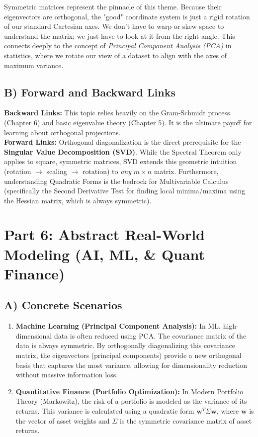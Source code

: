 \documentclass[11pt, letterpaper]{article}
\theoremstyle{definition}
\theoremstyle{remark}
\begin{document}
Symmetric matrices represent the pinnacle of this theme. Because their eigenvectors are orthogonal, the "good" coordinate system is just a rigid rotation of our standard Cartesian axes. We don't have to warp or skew space to understand the matrix; we just have to look at it from the right angle. This connects deeply to the concept of \textit{Principal Component Analysis (PCA)} in statistics, where we rotate our view of a dataset to align with the axes of maximum variance.

\subsection{B) Forward and Backward Links}
\textbf{Backward Links:} This topic relies heavily on the Gram-Schmidt process (Chapter 6) and basic eigenvalue theory (Chapter 5). It is the ultimate payoff for learning about orthogonal projections. \\
\textbf{Forward Links:} Orthogonal diagonalization is the direct prerequisite for the \textbf{Singular Value Decomposition (SVD)}. While the Spectral Theorem only applies to square, symmetric matrices, SVD extends this geometric intuition (rotation $\to$ scaling $\to$ rotation) to \textit{any} $m \times n$ matrix. Furthermore, understanding Quadratic Forms is the bedrock for Multivariable Calculus (specifically the Second Derivative Test for finding local minima/maxima using the Hessian matrix, which is always symmetric).

\section{Part 6: Abstract Real-World Modeling (AI, ML, \& Quant Finance)}

\subsection{A) Concrete Scenarios}
\begin{enumerate}
    \item \textbf{Machine Learning (Principal Component Analysis):} In ML, high-dimensional data is often reduced using PCA. The covariance matrix of the data is always symmetric. By orthogonally diagonalizing this covariance matrix, the eigenvectors (principal components) provide a new orthogonal basis that captures the most variance, allowing for dimensionality reduction without massive information loss.
    \item \textbf{Quantitative Finance (Portfolio Optimization):} In Modern Portfolio Theory (Markowitz), the risk of a portfolio is modeled as the variance of its returns. This variance is calculated using a quadratic form $\mathbf{w}^T \Sigma \mathbf{w}$, where $\mathbf{w}$ is the vector of asset weights and $\Sigma$ is the symmetric covariance matrix of asset returns.
\end{enumerate}
\end{document}
